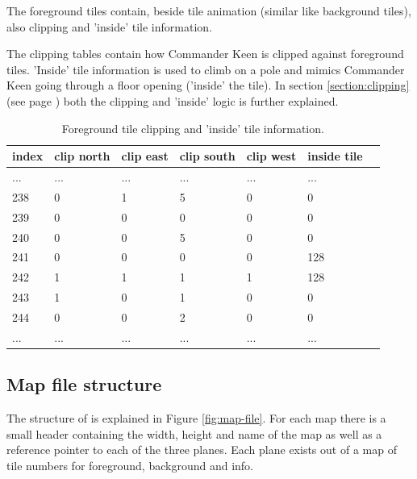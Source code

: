 \documentclass[book.tex]{subfiles}
\begin{document}
  \par
The foreground tiles contain, beside tile animation (similar like background tiles), also clipping and 'inside' tile information.\\
\par
The clipping tables contain how Commander Keen is clipped against foreground tiles. 'Inside' tile information is used to climb on a pole and mimics Commander Keen going through a floor opening ('inside' the tile). In section \ref{section:clipping} (see page \pageref{section:clipping}) both the clipping and 'inside' logic is further explained.\\
\begin{table}[H]
  \begin{tabularx}{\textwidth}[c]{XXXXXXX}
  \hline
  \textbf{index} & \textbf{clip north} & \textbf{clip east} & \textbf{clip south} & \textbf{clip west}  & \textbf{inside tile} \\ \hline
  ...    & ...     & ...    & ...   & ...     & ...      \\
  238    & 0       & 1      & 5     & 0       & 0        \\
  239    & 0       & 0      & 0     & 0       & 0        \\
  240    & 0       & 0      & 5     & 0       & 0        \\
  241    & 0       & 0      & 0     & 0       & 128       \\
  242    & 1       & 1      & 1     & 1       & 128       \\
  243    & 1       & 0      & 1     & 0       & 0       \\
  244    & 0       & 0      & 2     & 0       & 0       \\
  ...    & ...     & ...    & ...   & ...     & ...     \\
  \end{tabularx}
  \caption{Foreground tile clipping and 'inside' tile information.}
  \end{table}


\pagebreak
 
\subsection{Map file structure}
The structure of  is explained in Figure \ref{fig:map-file}. For each map there is a small header containing the width, height and name of the map as well as a reference pointer to each of the three planes. Each plane exists out of a map of tile numbers for foreground, background and info.\\
\end{document}

